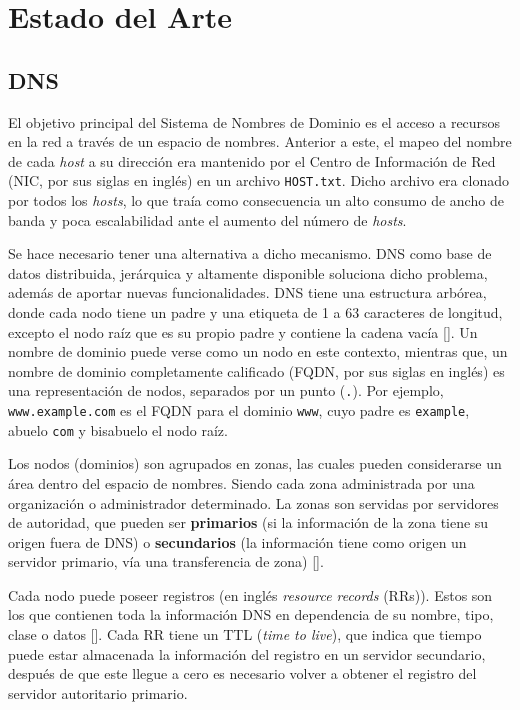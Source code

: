 \chapter{Estado del Arte}\label{chapter:state-of-the-art}

\section{DNS}

El objetivo principal del Sistema de Nombres de Dominio es el acceso a recursos en la red a través de un espacio de nombres. Anterior a este, el mapeo del nombre de cada \textit{host} a su dirección era mantenido por el Centro de Información de Red (NIC, por sus siglas en inglés) en un archivo \verb+HOST.txt+. Dicho archivo era clonado por todos los \textit{hosts}, lo que traía como consecuencia un alto consumo de ancho de banda y poca escalabilidad ante el aumento del número de \textit{hosts}.

Se hace necesario tener una alternativa a dicho mecanismo. DNS como base de datos distribuida, jerárquica y altamente disponible soluciona dicho problema, además de aportar nuevas funcionalidades. DNS tiene una estructura arbórea, donde cada nodo tiene un padre y una etiqueta de 1 a 63 caracteres de longitud, excepto el nodo raíz que es su propio padre y contiene la cadena vacía [\cite{Vixie_2007}]. Un nombre de dominio puede verse como un nodo en este contexto, mientras que, un nombre de dominio completamente calificado (FQDN, por sus siglas en inglés) es una representación de nodos, separados por un punto (\verb+.+). Por ejemplo, \verb+www.example.com+ es el FQDN para el dominio \verb+www+, cuyo padre es \verb+example+, abuelo \verb+com+ y bisabuelo el nodo raíz.

Los nodos (dominios) son agrupados en zonas, las cuales pueden considerarse un área dentro del espacio de nombres. Siendo cada zona administrada por una organización o administrador determinado. La zonas son servidas por servidores de autoridad, que pueden ser \textbf{primarios} (si la información de la zona tiene su origen fuera de DNS) o \textbf{secundarios} (la información tiene como origen un servidor primario, vía una transferencia de zona) [\cite{Vixie_2007}].

Cada nodo puede poseer registros (en inglés \textit{resource records} (RRs)). Estos son los que contienen toda la información DNS en dependencia de su nombre, tipo, clase o datos [\cite{rfc_1035}]. Cada RR tiene un TTL (\textit{time to live}), que indica que tiempo puede estar almacenada la información del registro en un servidor secundario, después de que este llegue a cero es necesario volver a obtener el registro del servidor autoritario primario.

